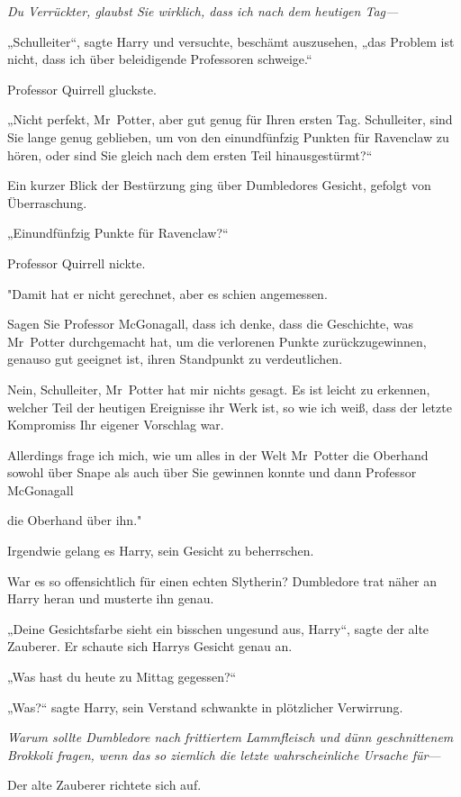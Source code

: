 {\emph{Du Verrückter, glaubst Sie wirklich, dass ich nach dem heutigen Tag—}

„Schulleiter“, sagte Harry und versuchte, beschämt auszusehen, „das Problem ist nicht, dass ich über beleidigende Professoren schweige.“

Professor Quirrell gluckste.

„Nicht perfekt, Mr~Potter, aber gut genug für Ihren ersten Tag. Schulleiter, sind Sie lange genug geblieben, um von den einundfünfzig Punkten für Ravenclaw zu hören, oder sind Sie gleich nach dem ersten Teil hinausgestürmt?“

Ein kurzer Blick der Bestürzung ging über Dumbledores Gesicht, gefolgt von Überraschung.

„Einundfünfzig Punkte für Ravenclaw?“

Professor Quirrell nickte.

"Damit hat er nicht gerechnet, aber es schien angemessen.

Sagen Sie Professor McGonagall, dass ich denke, dass die Geschichte, was Mr~Potter durchgemacht hat, um die verlorenen Punkte zurückzugewinnen, genauso gut geeignet ist, ihren Standpunkt zu verdeutlichen.

Nein, Schulleiter, Mr~Potter hat mir nichts gesagt. Es ist leicht zu erkennen, welcher Teil der heutigen Ereignisse ihr Werk ist, so wie ich weiß, dass der letzte Kompromiss Ihr eigener Vorschlag war.

Allerdings frage ich mich, wie um alles in der Welt Mr~Potter die Oberhand sowohl über Snape als auch über Sie gewinnen konnte und dann Professor McGonagall

die Oberhand über ihn."

Irgendwie gelang es Harry, sein Gesicht zu beherrschen.

War es so offensichtlich für einen echten Slytherin? Dumbledore trat näher an Harry heran und musterte ihn genau.

„Deine Gesichtsfarbe sieht ein bisschen ungesund aus, Harry“, sagte der alte Zauberer. Er schaute sich Harrys Gesicht genau an.

„Was hast du heute zu Mittag gegessen?“

„Was?“ sagte Harry, sein Verstand schwankte in plötzlicher Verwirrung.

\emph{Warum sollte Dumbledore nach frittiertem Lammfleisch und dünn geschnittenem Brokkoli fragen, wenn das so ziemlich die letzte wahrscheinliche Ursache für}—

Der alte Zauberer richtete sich auf.

}
